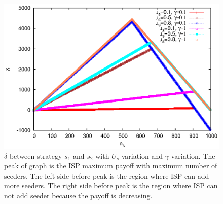 \documentclass[paper]{ieice}
\begin{document}
\begin{figure}[th] 
\begin{center}
\includegraphics[scale=0.65]{graphs/plotpay.eps}
\end{center}
\caption{$\delta$ between strategy $s_1$ and $s_2$ with $U_s$ variation and $\gamma$ variation.
The peak of graph is the ISP maximum payoff with maximum number of seeders.
The left side before peak is the region where ISP can add more seeders.
The right side before peak is the region where ISP can not add seeder because the payoff is decreasing.}
\label{fig:delta}
\vspace{-2mm}
\end{figure}

 
\end{document}
